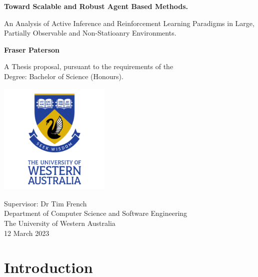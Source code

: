 \documentclass[12pt, twoside]{report}
\begin{document}
\begin{titlepage}
	\begin{center}
	
	\vspace*{0.5cm}
	
	\Huge
	\textbf{Toward Scalable and Robust Agent Based Methods.}
	
	\vspace{0.5cm}
	\Large
	An Analysis of Active Inference and Reinforcement Learning Paradigms in Large, Partially Observable and Non-Statioanry Environments.
	
	\vspace{1.5cm}

	\textbf{Fraser Paterson}

	\vspace{1.5cm}

	A Thesis proposal, pursuant to the requirements of the\\ 
	Degree: Bachelor of Science (Honours).  
	
	\vspace{2.0cm}

	\includegraphics[width=0.4\textwidth]{UWA_Logo.png}
	
	\vspace{2.0cm}	
	
	\Large
	Supervisor: Dr Tim French\\ 
	Department of Computer Science and Software Engineering\\
	The University of Western Australia\\
	12 March 2023
	
	\end{center}
\end{titlepage}


\tableofcontents

\cleardoublepage



\section{Introduction}
\end{document}
